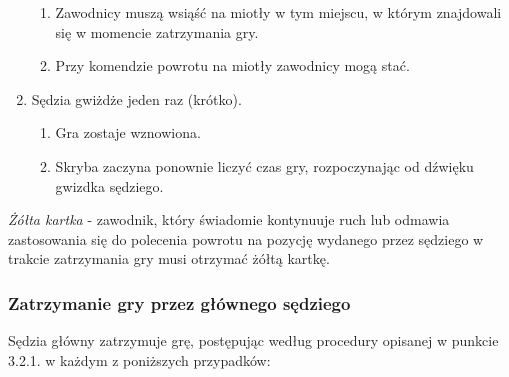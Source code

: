 \documentclass[12pt]{article}
\begin{document}
\begin{enumerate}
  \begin{enumerate}
  \item
        Zawodnicy muszą wsiąść na miotły w tym miejscu, w którym znajdowali
    się w momencie zatrzymania gry.
      \item
        Przy komendzie powrotu na miotły zawodnicy mogą stać.
      \end{enumerate}
\item
    Sędzia gwiżdże jeden raz (krótko).
  
  \begin{enumerate}
  \item
        Gra zostaje wznowiona.
      \item
        Skryba zaczyna ponownie liczyć czas gry, rozpoczynając od dźwięku
    gwizdka sędziego.
      \end{enumerate}
\end{enumerate}

\emph{Żółta kartka} - zawodnik, który świadomie kontynuuje ruch lub
odmawia zastosowania się do polecenia powrotu na pozycję wydanego przez
sędziego w trakcie zatrzymania gry musi otrzymać żółtą kartkę.

\subsubsection{Zatrzymanie gry przez głównego sędziego}

Sędzia główny zatrzymuje grę, postępując według procedury opisanej w
punkcie 3.2.1. w każdym z poniższych przypadków:
\end{document}
